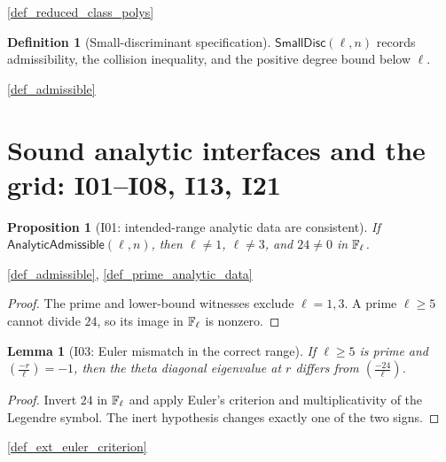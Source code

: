 \documentclass[11pt,a4paper]{article}
\numberwithin{equation}{section}
\theoremstyle{plain}\newtheorem{theorem}{Theorem}[section]\newaliascnt{proposition}{theorem}\newtheorem{proposition}[proposition]{Proposition}\aliascntresetthe{proposition}\newaliascnt{lemma}{theorem}\newtheorem{lemma}[lemma]{Lemma}\aliascntresetthe{lemma}
\theoremstyle{definition}\newaliascnt{definition}{theorem}\newtheorem{definition}[definition]{Definition}\aliascntresetthe{definition}\newaliascnt{notation}{theorem}\newtheorem{notation}[notation]{Notation}\aliascntresetthe{notation}
\providecommand{\lean}[1]{}\providecommand{\leanok}{}
\begin{document}
\begin{uses-statement}\ref{def_reduced_class_polys}\end{uses-statement}
\begin{definition}[Small-discriminant specification]\label{def_small_discriminant_spec}\lean{SptCM.SmallDiscriminantSpec}\leanok
$\mathsf{SmallDisc}(\ell,n)$ records admissibility, the collision inequality, and the positive degree bound below $\ell$.
\end{definition}
\begin{uses-statement}\ref{def_admissible}\end{uses-statement}
\section{Sound analytic interfaces and the grid: I01--I08, I13, I21}
\begin{proposition}[I01: intended-range analytic data are consistent]\label{prop_i01_prime_range}\lean{SptCM.Repair.analyticAdmissible_sound_range}\leanok
If $\mathsf{AnalyticAdmissible}(\ell,n)$, then
$\ell\ne1$, $\ell\ne3$, and $24\ne0$ in $\mathbb F_\ell$.
\end{proposition}
\begin{uses-statement}\ref{def_admissible}, \ref{def_prime_analytic_data}\end{uses-statement}
\begin{proof}
The prime and lower-bound witnesses exclude $\ell=1,3$.  A prime
$\ell\ge5$ cannot divide $24$, so its image in $\mathbb F_\ell$ is nonzero.
\end{proof}

\begin{lemma}[I03: Euler mismatch in the correct range]\label{lem_i03_euler_mismatch}\lean{SptCM.Repair.eulerInertMismatch_of_five_le}\leanok
If $\ell\ge5$ is prime and $\left(\frac{-r}{\ell}\right)=-1$, then the theta diagonal eigenvalue at $r$ differs from $\left(\frac{-24}{\ell}\right)$.
\end{lemma}
\begin{proof}
Invert $24$ in $\mathbb F_\ell$ and apply Euler's criterion and multiplicativity of the Legendre symbol.  The inert hypothesis changes exactly one of the two signs.
\end{proof}
\begin{uses-proof}\ref{def_ext_euler_criterion}\end{uses-proof}
\end{document}
